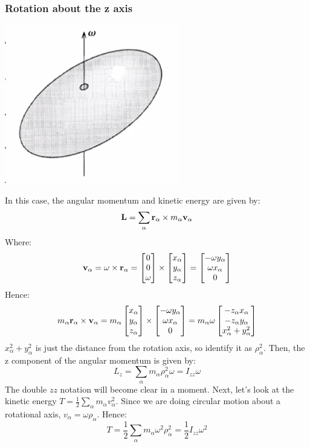 \documentclass[../PHYS306Notes.tex]{subfiles}
\begin{document}
\subsubsection{Rotation about the z axis}
\begin{center}
    \includegraphics[scale=1]{Lecture-17/l17-img5.png}
\end{center}
In this case, the angular momentum and kinetic energy are given by:
\[\mathbf{L} = \sum_\alpha \mathbf{r}_\alpha \times m_\alpha \mathbf{v}_\alpha\]
Where:
\[\mathbf{v}_\alpha = \mathbf{\omega} \times \mathbf{r}_\alpha = \begin{bmatrix}0 \\ 0 \\ \omega\end{bmatrix} \times \begin{bmatrix}x_\alpha \\ y_\alpha \\ z_\alpha\end{bmatrix} = \begin{bmatrix}-\omega y_\alpha \\ \omega x_\alpha \\ 0\end{bmatrix}\]
Hence:
\[m_\alpha \mathbf{r}_\alpha \times \mathbf{v}_\alpha = m_\alpha \begin{bmatrix}x_\alpha \\ y_\alpha \\ z_\alpha\end{bmatrix} \times \begin{bmatrix}-\omega y_\alpha \\ \omega x_\alpha \\ 0\end{bmatrix} = m_\alpha\omega\begin{bmatrix}-z_\alpha x_\alpha \\ -z_\alpha y_\alpha \\ x_\alpha^2 + y_\alpha^2\end{bmatrix}\] 
$x_\alpha^2 + y_\alpha^2$ is just the distance from the rotation axis, so identify it as $\rho_\alpha^2$. Then, the z component of the angular momentum is given by:
\[L_{z} = \sum_\alpha m_\alpha\rho_\alpha^2\omega = I_{zz}\omega\]
The double $zz$ notation will become clear in a moment. \newline Next, let's look at the kinetic energy $T = \frac{1}{2}\sum_\alpha m_\alpha v_\alpha^2$. Since we are doing circular motion about a rotational axis, $v_\alpha = \omega \rho_\alpha$. Hence:
\[T = \frac{1}{2} \sum_\alpha m_\alpha\omega^2 \rho_\alpha^2 = \frac{1}{2}I_{zz}\omega^2\]
\end{document}
